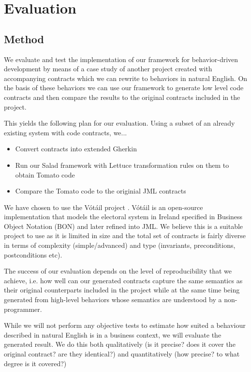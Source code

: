 \section{Evaluation}
\label{sec:Evaluation}
\subsection{Method}

We evaluate and test the implementation of our framework for behavior-driven development by means of a case study of another project created with accompanying contracts which we can rewrite to behaviors in natural English. On the basis of these behaviors we can use our framework to generate low level code contracts and then compare the results to the original contracts included in the project.
 
This yields the following plan for our evaluation. Using a subset of an already existing system with code contracts, we...

\begin{itemize}
	\item Convert contracts into extended Gherkin
	\item Run our Salad framework with Lettuce transformation rules on them to obtain Tomato code
	\item Compare the Tomato code to the originial JML contracts
\end{itemize}

We have chosen to use the V\'{o}t\'{a}il project \cite{votailCochranKiniry}. V\'{o}t\'{a}il is an open-source implementation that models the electoral system in Ireland specified in Business Object Notation (BON) \cite{bonmethod} and later refined into JML. We believe this is a suitable project to use as it is limited in size and the total set of contracts is fairly diverse in terms of complexity (simple/advanced) and type (invariants, preconditions, postconditions etc).

The success of our evaluation depends on the level of reproducibility that we achieve, i.e. how well can our generated contracts capture the same semantics as their original counterparts included in the project while at the same time being generated from high-level behaviors whose semantics are understood by a non-programmer.
 
While we will not perform any objective tests to estimate how suited a behaviour described in natural English is in a business context, we will evaluate the generated result. We do this both qualitatively (is it precise? does it cover the original contract? are they identical?) and quantitatively (how precise? to what degree is it covered?)
 
